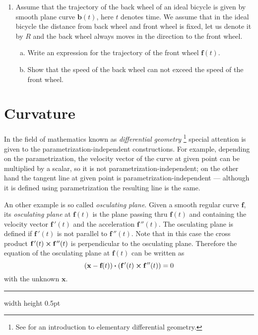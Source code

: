 \begin{enumerate}[\bfseries 1.]
  \item Assume that the trajectory of the back wheel of an ideal bicycle is given by smooth plane curve $\textbf{b}(t)$, here $t$ denotes time. 
  We assume that in the ideal bicycle the distance from back wheel and front wheel is fixed, let us denote it by $R$ and the back wheel always moves in the direction to the front wheel.
  
  \begin{enumerate}[(a)]
  \item Write an expression for the trajectory of the front wheel $\textbf{f}(t)$. 
  \item Show that the speed of the back wheel can not exceed the speed of the front wheel.
  \end{enumerate}
\end{enumerate}

\newpage
\section{Curvature}

In the field of mathematics known as \emph{differential
geometry}%
\footnote{See \cite{one} for an introduction to elementary differential geometry.} 
 special attention is given to the parametrization-independent constructions.
For example, depending on the parametrization, the velocity vector of the curve at given point can be multiplied by a scalar, so it is not parametrization-independent;
on the other hand the tangent line at given point is parametrization-independent --- although it is defined using parametrization the resulting line is the same.

An other example is so called \emph{osculating plane}.
Given a smooth regular curve $\textbf{f}$,
its \emph{osculating plane} at $\textbf{f}(t)$
is the plane passing thru $\textbf{f}(t)$ and containing the velocity vector $\textbf{f}\,'(t)$ and the acceleration $\textbf{f}\,''(t)$.
The osculating plane is defined if $\textbf{f}\,'(t)$ is not parallel to $\textbf{f}\,''(t)$.
Note that in this case the cross product $\textbf{f}\,'(t) \bm{\times} \textbf{f}\,''(t)$ is perpendicular to the osculating plane.
Therefore the equation of the osculating plane at $\textbf{f}(t)$ can be written as
\[(\textbf{x}-\textbf{f}(t)) \bm{\cdot} (\textbf{f}\,'(t) \bm{\times} \textbf{f}\,''(t))=0\]
with the unknown $\textbf{x}$.

\medskip
\hrule width \textwidth height 0.5pt

